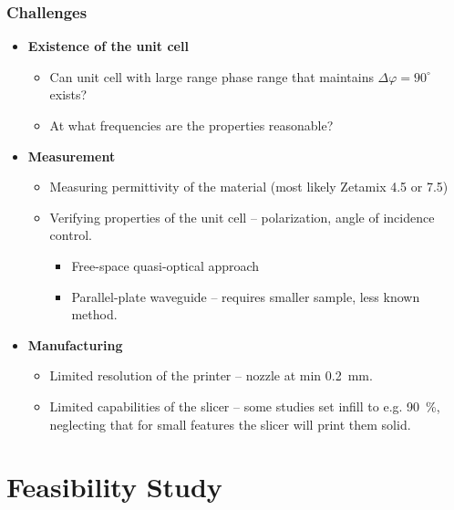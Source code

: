 \documentclass[aspectratio=43]{beamer}
\begin{document}
\begin{frame}[fragile]
  \frametitle{Challenges}
  \begin{itemize}
    \item \textbf{Existence of the unit cell}
      \begin{itemize}
        \item Can unit cell with large range phase range that maintains $\Delta \varphi = 90^\circ$ exists?
        \item At what frequencies are the properties reasonable?
      \end{itemize}
    \item \textbf{Measurement}
      \begin{itemize}
        \item Measuring permittivity of the material (most likely Zetamix 4.5 or 7.5)
        \item Verifying properties of the unit cell -- polarization, angle of incidence control.
          \begin{itemize}
            \item Free-space quasi-optical approach
            \item Parallel-plate waveguide -- requires smaller sample, less known method.
          \end{itemize}
      \end{itemize}
    \item \textbf{Manufacturing}
      \begin{itemize}
        \item Limited resolution of the printer -- nozzle at min 0.2~mm.
        \item Limited capabilities of the slicer -- some studies set infill to e.g. 90~\%, neglecting that for small features the slicer will print them solid.
      \end{itemize}
  \end{itemize}
\end{frame}



\section{Feasibility Study}
\end{document}
